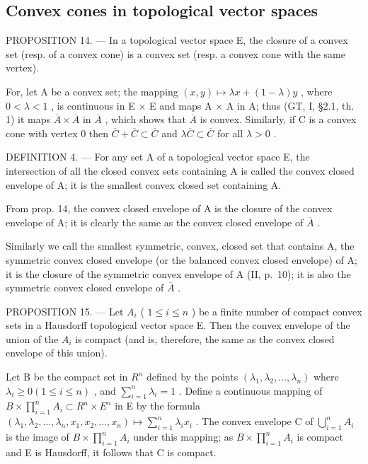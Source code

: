 \subsection{Convex cones in topological vector spaces}

PROPOSITION 14. --- In a topological vector space E, the closure of a convex set (resp. of a convex cone) is a convex set (resp. a convex cone with the same vertex).

For, let A be a convex set; the mapping \((x, y) \mapsto \lambda x + (1 - \lambda)y\) , where \(0 < \lambda < 1\) , is continuous in E × E and maps A × A in A; thus (GT, I, §2.1, th. 1) it maps \(\overline{A} \times \overline{A}\) in \(\overline{A}\) , which shows that \(\overline{A}\) is convex. Similarly, if C is a convex cone with vertex 0 then \(\overline{C} + \overline{C} \subset \overline{C}\) and \(\lambda\overline{C} \subset \overline{C}\) for all \(\lambda > 0\) .

DEFINITION 4. --- For any set A of a topological vector space E, the intersection of all the closed convex sets containing A is called the convex closed envelope of A; it is the smallest convex closed set containing A.

From prop. 14, the convex closed envelope of A is the closure of the convex envelope of A; it is clearly the same as the convex closed envelope of \(\overline{A}\) .

Similarly we call the smallest symmetric, convex, closed set that contains A, the symmetric convex closed envelope (or the balanced convex closed envelope) of A; it is the closure of the symmetric convex envelope of A (II, p.~10); it is also the symmetric convex closed envelope of \(\overline{A}\) .

PROPOSITION 15. --- Let \(A_{i}\) ( \(1 \leqslant i \leqslant n\) ) be a finite number of compact convex sets in a Hausdorff topological vector space E. Then the convex envelope of the union of the \(A_{i}\) is compact (and is, therefore, the same as the convex closed envelope of this union).

Let B be the compact set in \(R^{n}\) defined by the points \((\lambda_{1},\lambda_{2},\ldots,\lambda_{n})\) where \(\lambda_{i}\geqslant0(1\leqslant i\leqslant n)\) , and \(\sum_{i=1}^{n}\lambda_{i}=1\) . Define a continuous mapping of \(B\times\prod_{i=1}^{n}A_{i}\subset R^{n}\times E^{n}\) in E by the formula \((\lambda_{1},\lambda_{2},\ldots,\lambda_{n},x_{1},x_{2},\ldots,x_{n})\mapsto\sum_{i=1}^{n}\lambda_{i}x_{i}\) . The convex envelope C of \(\bigcup_{i=1}^{n}A_{i}\) is the image of \(B\times\prod_{i=1}^{n}A_{i}\) under this mapping; as \(B\times\prod_{i=1}^{n}A_{i}\) is compact and E is Hausdorff, it follows that C is compact.

